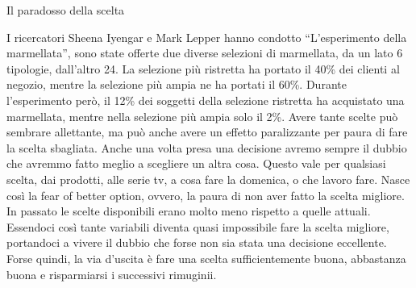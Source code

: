 \documentclass[12pt]{book} %
\begin{document}
\bigskip
\begin{mdframed}[linewidth=1pt]
Il paradosso della scelta

I ricercatori Sheena Iyengar e Mark Lepper hanno condotto “L'esperimento della marmellata”, sono
state offerte due diverse selezioni di marmellata, da un lato 6 tipologie, dall'altro 24. La
selezione più ristretta ha portato il 40\% dei clienti al negozio, mentre la selezione più ampia ne ha portati il 60\%.
Durante l'esperimento però, il 12\% dei soggetti della selezione ristretta ha acquistato una
marmellata, mentre nella selezione più ampia solo il 2\%. Avere tante scelte può sembrare allettante, ma può anche
avere un effetto paralizzante per paura di fare la scelta sbagliata. Anche una volta presa una decisione avremo sempre
il dubbio che avremmo fatto meglio a scegliere un altra cosa. Questo vale per qualsiasi scelta, dai prodotti, alle
serie tv, a cosa fare la domenica, o che lavoro fare. Nasce così la fear of better option, ovvero, la paura di non aver
fatto la scelta migliore. In passato le scelte disponibili erano molto meno rispetto a quelle attuali. Essendoci così
tante variabili diventa quasi impossibile fare la scelta migliore, portandoci a vivere il dubbio che forse non sia
stata una decisione eccellente. Forse quindi, la via d'uscita è fare una scelta sufficientemente
buona, abbastanza buona e risparmiarsi i successivi rimuginii.
\end{mdframed}
\end{document}
